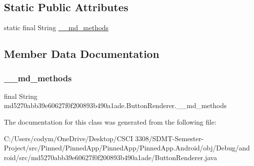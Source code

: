 \subsection*{Static Public Attributes}
\begin{DoxyCompactItemize}
\item 
static final String \hyperlink{classmd5270abb39e60627f0f200893b490a1ade_1_1_button_renderer_aa6804b17a4e0acb62c327822a4dea5b2}{\+\_\+\+\_\+md\+\_\+methods}
\end{DoxyCompactItemize}


\subsection{Member Data Documentation}
\mbox{\label{classmd5270abb39e60627f0f200893b490a1ade_1_1_button_renderer_aa6804b17a4e0acb62c327822a4dea5b2}} 
\subsubsection{\texorpdfstring{\+\_\+\+\_\+md\+\_\+methods}{\_\_md\_methods}}
{\footnotesize\ttfamily final String md5270abb39e60627f0f200893b490a1ade.\+Button\+Renderer.\+\_\+\+\_\+md\+\_\+methods\hspace{0.3cm}{\ttfamily [static]}}



The documentation for this class was generated from the following file\+:\begin{DoxyCompactItemize}
\item 
C\+:/\+Users/codym/\+One\+Drive/\+Desktop/\+C\+S\+C\+I 3308/\+S\+D\+M\+T-\/\+Semester-\/\+Project/src/\+Pinned/\+Pinned\+App/\+Pinned\+App/\+Pinned\+App.\+Android/obj/\+Debug/android/src/md5270abb39e60627f0f200893b490a1ade/Button\+Renderer.\+java\end{DoxyCompactItemize}
